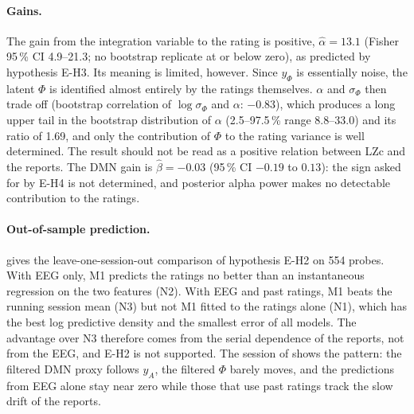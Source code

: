 \documentclass[12pt,a4paper]{article}
\theoremstyle{plain}
\theoremstyle{definition}
\theoremstyle{remark}
\newcommand{\sPhi}{\sigma_{\Phi}}
\begin{document}
\paragraph{Gains.} The gain from the integration variable to the rating is positive, $\hat\alpha=13.1$ (Fisher 95\,\% CI 4.9--21.3; no bootstrap replicate at or below zero), as predicted by hypothesis E-H3. Its meaning is limited, however. Since $y_\Phi$ is essentially noise, the latent $\Phi$ is identified almost entirely by the ratings themselves. $\alpha$ and $\sPhi$ then trade off (bootstrap correlation of $\log\sPhi$ and $\alpha$: $-0.83$), which produces a long upper tail in the bootstrap distribution of $\alpha$ (2.5--97.5\,\% range 8.8--33.0) and its ratio of 1.69, and only the contribution of $\Phi$ to the rating variance is well determined. The result should not be read as a positive relation between LZc and the reports. The DMN gain is $\hat\beta=-0.03$ (95\,\% CI $-0.19$ to $0.13$): the sign asked for by E-H4 is not determined, and posterior alpha power makes no detectable contribution to the ratings.

\paragraph{Out-of-sample prediction.}  gives the leave-one-session-out comparison of hypothesis E-H2 on 554 probes. With EEG only, M1 predicts the ratings no better than an instantaneous regression on the two features (N2). With EEG and past ratings, M1 beats the running session mean (N3) but not M1 fitted to the ratings alone (N1), which has the best log predictive density and the smallest error of all models. The advantage over N3 therefore comes from the serial dependence of the reports, not from the EEG, and E-H2 is not supported. The session of  shows the pattern: the filtered DMN proxy follows $y_A$, the filtered $\Phi$ barely moves, and the predictions from EEG alone stay near zero while those that use past ratings track the slow drift of the reports.
\end{document}
